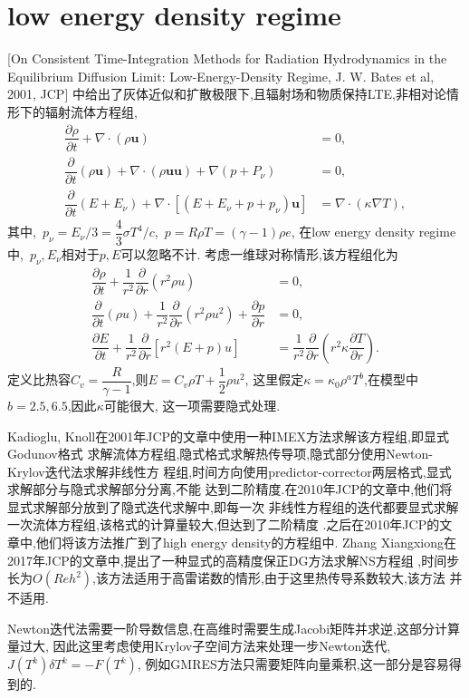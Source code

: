 \documentclass[a4paper, 11pt]{ctexart}
\numberwithin{equation}{section}
\numberwithin{figure}{section}
\newcommand\bu{\boldsymbol{u}}
\newcommand\pd[2]{\dfrac{\partial {#1}}{\partial {#2}}}
\begin{document}
\section{low energy density regime}
[On Consistent Time-Integration Methods for Radiation Hydrodynamics in
the Equilibrium Diffusion Limit: Low-Energy-Density Regime, J. W. Bates et al, 2001, JCP]
中给出了灰体近似和扩散极限下,且辐射场和物质保持LTE,非相对论情形下的辐射流体方程组,
\begin{align}
  \pd{\rho}{t}+\nabla\cdot(\rho\bu)&=0,\\
  \pd{}{t}(\rho\bu)+\nabla\cdot(\rho\bu\bu)+\nabla (p+P_\nu)&=0,\\
  \pd{}{t}(E+E_\nu)+\nabla\cdot[(E+E_\nu+p+p_\nu)\bu]&=\nabla\cdot(\kappa\nabla T),
\end{align}
其中,~$p_\nu=E_\nu/3=\dfrac43\sigma T^4/c$,~$p=R\rho T=(\gamma-1)\rho e$,
在low energy density regime中,~$p_\nu,E_\nu$相对于$p,E$可以忽略不计.
考虑一维球对称情形,该方程组化为
\begin{align}
  \pd{\rho}{t}+\dfrac{1}{r^2}\pd{}{r}(r^2\rho u)&=0,\\
  \pd{}{t}(\rho u)+\dfrac{1}{r^2}\pd{}{r}(r^2\rho u^2)+\pd{p}{r}&=0,\\
  \pd{E}{t}+\dfrac{1}{r^2}\pd{}{r}[r^2(E+p)u]&=
  \dfrac{1}{r^2}\pd{}{r}(r^2\kappa \pd{T}{r}).
\end{align}
定义比热容$C_v=\dfrac{R}{\gamma-1}$,则$E=C_v\rho T+\dfrac12\rho u^2$,
这里假定$\kappa=\kappa_0\rho^a T^b$,在模型中$b=2.5,6.5$,因此$\kappa$可能很大,
这一项需要隐式处理.

Kadioglu, Knoll在2001年JCP的文章中使用一种IMEX方法求解该方程组,即显式Godunov格式
求解流体方程组,隐式格式求解热传导项,隐式部分使用Newton-Krylov迭代法求解非线性方
程组,时间方向使用predictor-corrector两层格式,显式求解部分与隐式求解部分分离,不能
达到二阶精度.在2010年JCP的文章中,他们将显式求解部分放到了隐式迭代求解中,即每一次
非线性方程组的迭代都要显式求解一次流体方程组,该格式的计算量较大,但达到了二阶精度
.之后在2010年JCP的文章中,他们将该方法推广到了high energy density的方程组中.
Zhang Xiangxiong在2017年JCP的文章中,提出了一种显式的高精度保正DG方法求解NS方程组
,时间步长为$O(Re h^2)$,该方法适用于高雷诺数的情形,由于这里热传导系数较大,该方法
并不适用.

Newton迭代法需要一阶导数信息,在高维时需要生成Jacobi矩阵并求逆,这部分计算量过大,
因此这里考虑使用Krylov子空间方法来处理一步Newton迭代,~$J(T^k)\delta T^k=-F(T^k)$,
例如GMRES方法只需要矩阵向量乘积,这一部分是容易得到的.
\end{document}
